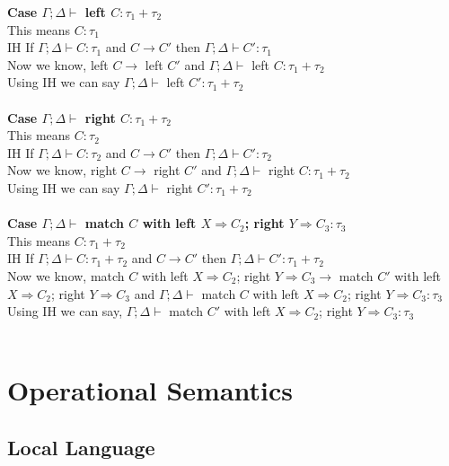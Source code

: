 \documentclass{article}
\begin{document}
\textbf{Case $\Gamma; \Delta \vdash$ left $C : \tau_1+\tau_2$ } \\
This means $C : \tau_1$ \\
IH If $\Gamma; \Delta \vdash C : \tau_1$ and  $C \to C'$ then $\Gamma;\Delta \vdash C' : \tau_1$ \\
Now we know, left $C \to$ left $C'$ and $\Gamma; \Delta \vdash$ left $C : \tau_1+\tau_2$ \\
Using IH we can say $\Gamma; \Delta \vdash$ left $ C' : \tau_1+\tau_2$ \\\\
\textbf{Case $\Gamma; \Delta \vdash$ right $C : \tau_1+\tau_2$ } \\
This means $C : \tau_2$ \\
IH If $\Gamma; \Delta \vdash C : \tau_2$ and  $C \to C'$ then $\Gamma; \Delta \vdash C' : \tau_2$ \\
Now we know, right $C \to$ right $C'$ and $\Gamma; \Delta \vdash$ right $C : \tau_1+\tau_2$ \\
Using IH we can say $\Gamma;\Delta \vdash$ right $ C' : \tau_1+\tau_2$ \\\\
\textbf{Case $\Gamma;\Delta \vdash$ match $C$ with left $X \Rightarrow C_2 $; right $ Y \Rightarrow C_3 : \tau_3$ } \\
This means $C : \tau_1 + \tau_2$ \\
IH If $\Gamma;\Delta \vdash C : \tau_1+\tau_2$ and  $C \to C'$ then $\Gamma; \Delta \vdash C' : \tau_1+\tau_2$ \\
Now we know, match $C$ with left $X \Rightarrow C_2 $; right $ Y \Rightarrow C_3 \to$
match $C'$ with left $X \Rightarrow C_2 $; right $ Y \Rightarrow C_3$ and $\Gamma; \Delta \vdash$ match $C$ with left $X \Rightarrow C_2 $; right $ Y \Rightarrow C_3 : \tau_3$ \\
Using IH we can say, $\Gamma; \Delta \vdash$ match $C'$ with left $X \Rightarrow C_2 $; right $ Y \Rightarrow C_3 : \tau_3$ \\\\


\section{Operational Semantics}
\subsection{Local Language}
\begin{syntax}
     \alternative{()}
\end{syntax}
\end{document}
